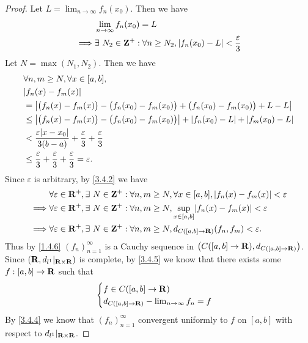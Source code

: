 \begin{proof}
  Let \(L = \lim_{n \to \infty} f_n(x_0)\).
  Then we have
  \begin{align*}
             & \lim_{n \to \infty} f_n(x_0) = L                                                       \\
    \implies & \exists\ N_2 \in \mathbf{Z}^+ : \forall n \geq N_2, \left\lvert f_n(x_0) - L\right\rvert < \frac{\varepsilon}{3}
  \end{align*}
  Let \(N = \max(N_1, N_2)\).
  Then we have
  \begin{align*}
     & \forall n, m \geq N, \forall x \in [a, b],                                                                     \\
     & \abs{f_n(x) - f_m(x)}                                                                                          \\
     & = \abs{\big(f_n(x) - f_m(x)\big) - \big(f_n(x_0) - f_m(x_0)\big) + \big(f_n(x_0) - f_m(x_0)\big) + L - L}      \\
     & \leq \abs{\big(f_n(x) - f_m(x)\big) - \big(f_n(x_0) - f_m(x_0)\big)} + \abs{f_n(x_0) - L} + \abs{f_m(x_0) - L} \\
     & < \frac{\varepsilon \abs{x - x_0}}{3(b - a)} + \frac{\varepsilon}{3} + \frac{\varepsilon}{3}                   \\
     & \leq \frac{\varepsilon}{3} + \frac{\varepsilon}{3} + \frac{\varepsilon}{3} = \varepsilon.
  \end{align*}
  Since \(\varepsilon\) is arbitrary, by \cref{3.4.2} we have
  \begin{align*}
             & \forall \varepsilon \in \R^+, \exists\ N \in \Z^+ : \forall n, m \geq N, \forall x \in [a, b], \abs{f_n(x) - f_m(x)} < \varepsilon \\
    \implies & \forall \varepsilon \in \R^+, \exists\ N \in \Z^+ : \forall n, m \geq N, \sup_{x \in [a, b]}\abs{f_n(x) - f_m(x)} < \varepsilon    \\
    \implies & \forall \varepsilon \in \R^+, \exists\ N \in \Z^+ : \forall n, m \geq N, d_{C([a, b] \to \R)}(f_n, f_m) < \varepsilon.
  \end{align*}
  Thus by \cref{1.4.6} \((f_n)_{n = 1}^\infty\) is a Cauchy sequence in \(\big(C([a, b] \to \mathbf{R}), d_{C([a, b] \to \mathbf{R})}\big)\).
  Since \((\mathbf{R}, d_{l^1}|_{\mathbf{R} \times \mathbf{R}})\) is complete, by \cref{3.4.5} we know that there exists some \(f : [a, b] \to \mathbf{R}\) such that
  \[
    \begin{cases}
      f \in C([a, b] \to \mathbf{R}) \\
      d_{C([a, b] \to \mathbf{R})} - \lim_{n \to \infty} f_n = f
    \end{cases}
  \]
  By \cref{3.4.4} we know that \((f_n)_{n = 1}^\infty\) convergent uniformly to \(f\) on \([a, b]\) with respect to \(d_{l^1}|_{\mathbf{R} \times \mathbf{R}}\).


\end{proof}
